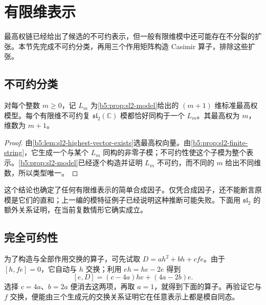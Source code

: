 
\section{有限维表示}
\label{b5:sec:1403}


%
%

最高权链已经给出了候选的不可约表示，但一般有限维模中还可能存在不分裂的扩张。本节先完成不可约分类，再用三个作用矩阵构造 Casimir 算子，排除这些扩张。

\subsection{不可约分类}
\label{b5:subsec:1403:01}

\begin{theorem}\label{b5:thm:sl2-classification}
	对每个整数 \(m\ge0\)，记 \(L_m\) 为\cref{b5:prop:sl2-model}给出的 \((m+1)\) 维标准最高权模型。每个有限维不可约复 \(\mathfrak{sl}_2(\mathbb C)\) 模都恰好同构于一个 \(L_m\)。其最高权为 \(m\)，维数为 \(m+1\)。
\end{theorem}
\begin{proof}
	由\cref{b5:lem:sl2-highest-vector-exists}选最高权向量。由\cref{b5:prop:sl2-finite-string}，它生成一个与某个 \(L_m\) 同构的非零子模；不可约性使这个子模为整个表示。\cref{b5:prop:sl2-model}已经逐个构造并证明 \(L_m\) 不可约，而不同的 \(m\) 给出不同维数，所以类型唯一。
\end{proof}
这个结论也确定了任何有限维表示的简单合成因子。仅凭合成因子，还不能断言原模是它们的直和；上一编的模特征例子已经说明这种推断可能失败。下面用 \(\mathfrak{sl}_2\) 的额外关系证明，在当前复数情形它确实成立。

\subsection{完全可约性}
\label{b5:subsec:1403:02}

为了构造与全部作用交换的算子，可先试取 \(D=ah^2+bh+cfe\)。由于 \([h,fe]=0\)，它自动与 \(h\) 交换；利用 \(eh=he-2e\) 得到
\[
	[e,D]=(c-4a)he+(4a-2b)e.
\]
选择 \(c=4a\)、\(b=2a\) 便消去这两项，再取 \(a=1\)，就得到下面的算子。再验证它与 \(f\) 交换，便能由三个生成元的交换关系证明它在任意表示上都是模自同态。

